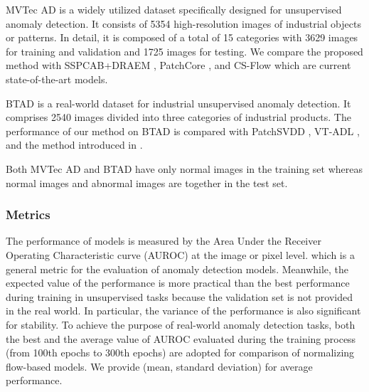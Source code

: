 \documentclass[letterpaper]{article}
\begin{document}
MVTec AD is a widely utilized dataset specifically designed for unsupervised anomaly detection. It consists of 5354 high-resolution images of industrial objects or patterns. In detail, it is composed of a total of 15 categories with 3629 images for training and validation and 1725 images for testing. We compare the proposed method with SSPCAB+DRAEM \cite{sspcab, draem}, PatchCore \cite{patchcore}, and CS-Flow \cite{cs-flow} which are current state-of-the-art models. 

BTAD is a real-world dataset for industrial unsupervised anomaly detection. It comprises 2540 images divided into three categories of industrial products. The performance of our method on BTAD is compared with PatchSVDD \cite{patchsvdd}, VT-ADL \cite{vt-adl}, and the method introduced in \cite{mspbrl}.

Both MVTec AD and BTAD have only normal images in the training set whereas normal images and abnormal images are together in the test set.

\subsubsection{Metrics}
The performance of models is measured by the Area Under the Receiver Operating Characteristic curve (AUROC) at the image or pixel level. which is a general metric for the evaluation of anomaly detection models. Meanwhile, the expected value of the performance is more practical than the best performance during training in unsupervised tasks because the validation set is not provided in the real world. In particular, the variance of the performance is also significant for stability. To achieve the purpose of real-world anomaly detection tasks, both the best and the average value of AUROC evaluated during the training process (from 100th epochs to 300th epochs) are adopted for comparison of normalizing flow-based models. We provide (mean, standard deviation) for average performance.
\end{document}
